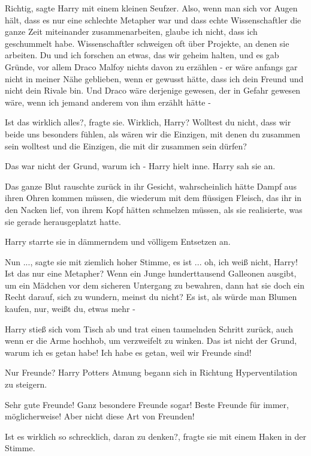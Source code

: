 \glqq{}Richtig\grqq{}, sagte Harry mit einem kleinen Seufzer. \glqq{}Also, wenn
man sich vor Augen hält, dass es nur eine schlechte Metapher war und dass echte
Wissenschaftler die ganze Zeit miteinander zusammenarbeiten, glaube ich nicht,
dass ich geschummelt habe. Wissenschaftler schweigen oft über Projekte, an denen
sie arbeiten. Du und ich forschen an etwas, das wir geheim halten, und es gab
Gründe, vor allem Draco Malfoy nichts davon zu erzählen - er wäre anfangs gar
nicht in meiner Nähe geblieben, wenn er gewusst hätte, dass ich dein Freund und
nicht dein Rivale bin. Und Draco wäre derjenige gewesen, der in Gefahr gewesen
wäre, wenn ich jemand anderem von ihm erzählt hätte -\grqq{}

\glqq{}Ist das wirklich alles?\grqq{}, fragte sie. \glqq{}Wirklich, Harry?
Wolltest du nicht, dass wir beide uns besonders fühlen, als wären wir die
Einzigen, mit denen du zusammen sein wolltest und die Einzigen, die mit dir
zusammen sein dürfen?\grqq{}

\glqq{}Das war nicht der Grund, warum ich -\grqq{} Harry hielt inne. Harry sah
sie an.

Das ganze Blut rauschte zurück in ihr Gesicht, wahrscheinlich hätte Dampf aus
ihren Ohren kommen müssen, die wiederum mit dem flüssigen Fleisch, das ihr in
den Nacken lief, von ihrem Kopf hätten schmelzen müssen, als sie realisierte,
was sie gerade herausgeplatzt hatte.

Harry starrte sie in dämmerndem und völligem Entsetzen an.

\glqq{}Nun ...\grqq{}, sagte sie mit ziemlich hoher Stimme, \glqq{}es ist ... oh,
ich weiß nicht, Harry! Ist das nur eine Metapher? Wenn ein Junge hunderttausend
Galleonen ausgibt, um ein Mädchen vor dem sicheren Untergang zu bewahren, dann
hat sie doch ein Recht darauf, sich zu wundern, meinst du nicht? Es ist, als
würde man Blumen kaufen, nur, weißt du, etwas mehr -\grqq{}

Harry stieß sich vom Tisch ab und trat einen taumelnden Schritt zurück, auch
wenn er die Arme hochhob, um verzweifelt zu winken. \glqq{}Das ist nicht der
Grund, warum ich es getan habe! Ich habe es getan, weil wir Freunde sind!\grqq{}

\glqq{}Nur Freunde?\grqq{} Harry Potters Atmung begann sich in Richtung
Hyperventilation zu steigern.

\glqq{}Sehr gute Freunde! Ganz besondere Freunde sogar! Beste Freunde für immer,
möglicherweise! Aber nicht diese Art von Freunden!\grqq{}

\glqq{}Ist es wirklich so schrecklich, daran zu denken?\grqq{}, fragte sie mit
einem Haken in der Stimme.

